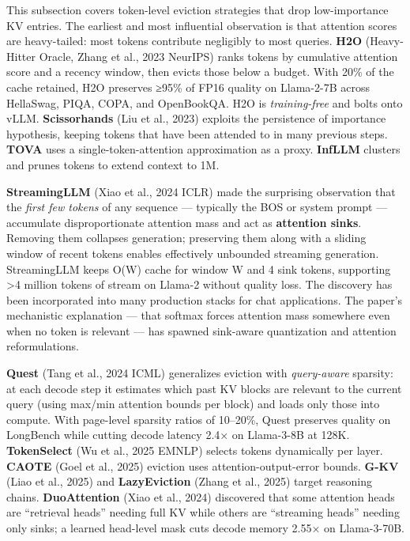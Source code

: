 This subsection covers token-level eviction strategies that drop low-importance KV entries. The earliest and most influential observation is that attention scores are heavy-tailed: most tokens contribute negligibly to most queries. \textbf{H2O} (Heavy-Hitter Oracle, Zhang et al., 2023 NeurIPS) ranks tokens by cumulative attention score and a recency window, then evicts those below a budget. With 20\% of the cache retained, H2O preserves ≥95\% of FP16 quality on Llama-2-7B across HellaSwag, PIQA, COPA, and OpenBookQA. H2O is \emph{training-free} and bolts onto vLLM. \textbf{Scissorhands} (Liu et al., 2023) exploits the persistence of importance hypothesis, keeping tokens that have been attended to in many previous steps. \textbf{TOVA} uses a single-token-attention approximation as a proxy. \textbf{InfLLM} clusters and prunes tokens to extend context to 1M.

\textbf{StreamingLLM} (Xiao et al., 2024 ICLR) made the surprising observation that the \emph{first few tokens} of any sequence --- typically the BOS or system prompt --- accumulate disproportionate attention mass and act as \textbf{attention sinks}. Removing them collapses generation; preserving them along with a sliding window of recent tokens enables effectively unbounded streaming generation. StreamingLLM keeps O(W) cache for window W and 4 sink tokens, supporting \textgreater4 million tokens of stream on Llama-2 without quality loss. The discovery has been incorporated into many production stacks for chat applications. The paper's mechanistic explanation --- that softmax forces attention mass somewhere even when no token is relevant --- has spawned sink-aware quantization and attention reformulations.

\textbf{Quest} (Tang et al., 2024 ICML) generalizes eviction with \emph{query-aware} sparsity: at each decode step it estimates which past KV blocks are relevant to the current query (using max/min attention bounds per block) and loads only those into compute. With page-level sparsity ratios of 10--20\%, Quest preserves quality on LongBench while cutting decode latency 2.4× on Llama-3-8B at 128K. \textbf{TokenSelect} (Wu et al., 2025 EMNLP) selects tokens dynamically per layer. \textbf{CAOTE} (Goel et al., 2025) eviction uses attention-output-error bounds. \textbf{G-KV} (Liao et al., 2025) and \textbf{LazyEviction} (Zhang et al., 2025) target reasoning chains. \textbf{DuoAttention} (Xiao et al., 2024) discovered that some attention heads are ``retrieval heads'' needing full KV while others are ``streaming heads'' needing only sinks; a learned head-level mask cuts decode memory 2.55× on Llama-3-70B.

